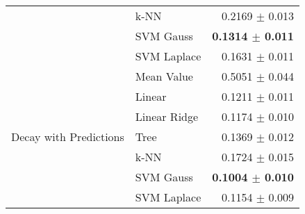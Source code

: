 \documentclass[10pt]{article}
\begin{document}
\begin{table}[H]
\begin{tabular}{llr}
                               & k-NN         & 0.2169 $\pm$ 0.013 \\
                               & SVM Gauss    & \textbf{0.1314 $\pm$ 0.011} \\
                               & SVM Laplace  & 0.1631 $\pm$ 0.011 \\
    \hline
    \multirow{7}{*}{Decay with Predictions} & Mean Value   & 0.5051 $\pm$ 0.044 \\
                               & Linear       & 0.1211 $\pm$ 0.011 \\
                               & Linear Ridge & 0.1174 $\pm$ 0.010 \\
                               & Tree         & 0.1369 $\pm$ 0.012 \\
                               & k-NN         & 0.1724 $\pm$ 0.015 \\
                               & SVM Gauss    & \textbf{0.1004 $\pm$ 0.010} \\
                               & SVM Laplace  & 0.1154 $\pm$ 0.009 \\
    \hline\hline
  \end{tabular}
  \label{tab:gapresults}
\end{table}







\end{document}
